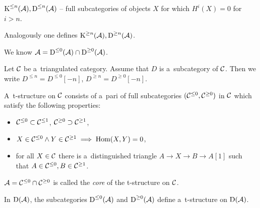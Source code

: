 



    
    \begin{definition}
        $\operatorname{K}^{\leq n}(\mathcal{A}), \operatorname{D}^{\leq n}(\mathcal{A})$ 
        -- full subcategories of objects $X$ for which $H^i(X) = 0$ for $i>n$.
        
        Analogously one defines $\operatorname{K}^{\geq n}(\mathcal{A}), \operatorname{D}^{\geq n}(\mathcal{A})$.
    \end{definition}
    We know $\mathcal{A} = \operatorname{D}^{\leq 0}(\mathcal{A}) \cap \operatorname{D}^{\geq 0}(\mathcal{A})$.
    
    \begin{definition}
        Let $\mathcal{C}$ be a~triangulated category. Assume that $D$ 
        is a~subcategory of $\mathcal{C}$. 
        Then we write $D^{\leq n} = D^{\leq 0}[-n]$,
        $D^{\geq n} = D^{\geq 0} [-n]$.
    \end{definition}
    
    \begin{definition}[t-structure]
        A~t-structure on $\mathcal{C}$ consists of a~pari of full subcategories
        $(\mathcal{C}^{\leq 0}, \mathcal{C}^{\geq 0})$ in $\mathcal{C}$ which satisfy the following properties:
        \begin{itemize}
            \item $\mathcal{C}^{\leq 0} \subset \mathcal{C}^{\leq 1}$,
            $\mathcal{C}^{\geq 0} \supset \mathcal{C}^{\geq 1}$,
            \item $X \in \mathcal{C}^{\leq 0} \wedge Y \in \mathcal{C}^{\geq 1} 
            \implies \operatorname{Hom}(X,Y) = 0$,
            \item for all $X \in \mathcal{C}$ there is a~distinguished triangle
            $A \to X \to B \to A[1]$
            such that ${A \in \mathcal{C}^{\leq 0}}, {B \in \mathcal{C}^{\geq 1}}$.
        \end{itemize}
    \end{definition}
    
    \begin{definition}[core]
        $\mathcal{A} = \mathcal{C}^{\leq 0} \cap \mathcal{C}^{\geq 0}$ is called 
        the {\em core} of the t-structure on $\mathcal{C}$.
    \end{definition}
    
    \begin{proposition}
        In $\operatorname{D}(\mathcal{A})$, the subcategories
        $\operatorname{D}^{\leq0}(\mathcal{A})$ and $\operatorname{D}^{\geq0}(\mathcal{A})$ define 
        a~t-structure on $\operatorname{D}(\mathcal{A})$.
    \end{proposition}
    
